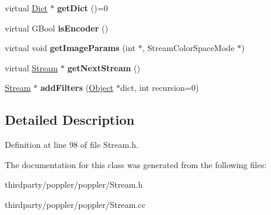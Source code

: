 \begin{DoxyCompactItemize}
virtual \hyperlink{class_dict}{Dict} $\ast$ {\bfseries get\+Dict} ()=0
\item 
\mbox{\label{class_stream_aa543edd0c6926c7f5272341198a61352}} 
virtual G\+Bool {\bfseries is\+Encoder} ()
\item 
\mbox{\label{class_stream_a49852d813248278832bb626d5e7768bf}} 
virtual void {\bfseries get\+Image\+Params} (int $\ast$, Stream\+Color\+Space\+Mode $\ast$)
\item 
\mbox{\label{class_stream_abb26dd02b9795d118d408298760d9719}} 
virtual \hyperlink{class_stream}{Stream} $\ast$ {\bfseries get\+Next\+Stream} ()
\item 
\mbox{\label{class_stream_ac931adcb668da604632428101cdef2b1}} 
\hyperlink{class_stream}{Stream} $\ast$ {\bfseries add\+Filters} (\hyperlink{class_object}{Object} $\ast$dict, int recursion=0)
\end{DoxyCompactItemize}


\subsection{Detailed Description}


Definition at line 98 of file Stream.\+h.



The documentation for this class was generated from the following files\+:\begin{DoxyCompactItemize}
\item 
thirdparty/poppler/poppler/Stream.\+h\item 
thirdparty/poppler/poppler/Stream.\+cc\end{DoxyCompactItemize}
